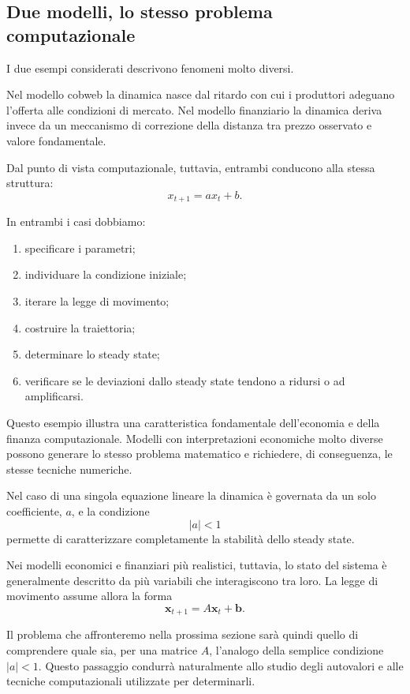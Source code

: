 \documentclass{book}
\begin{document}
\subsection{Due modelli, lo stesso problema computazionale}

I due esempi considerati descrivono fenomeni molto diversi.

Nel modello cobweb la dinamica nasce dal ritardo con cui i produttori
adeguano l'offerta alle condizioni di mercato. Nel modello finanziario
la dinamica deriva invece da un meccanismo di correzione della distanza
tra prezzo osservato e valore fondamentale.

Dal punto di vista computazionale, tuttavia, entrambi conducono alla
stessa struttura:
\[
x_{t+1}=ax_t+b.
\]

In entrambi i casi dobbiamo:

\begin{enumerate}
    \item specificare i parametri;
    \item individuare la condizione iniziale;
    \item iterare la legge di movimento;
    \item costruire la traiettoria;
    \item determinare lo steady state;
    \item verificare se le deviazioni dallo steady state tendono a
    ridursi o ad amplificarsi.
\end{enumerate}

Questo esempio illustra una caratteristica fondamentale
dell'economia e della finanza computazionale. Modelli con
interpretazioni economiche molto diverse possono generare lo stesso
problema matematico e richiedere, di conseguenza, le stesse tecniche
numeriche.

Nel caso di una singola equazione lineare la dinamica è governata da
un solo coefficiente, $a$, e la condizione
\[
|a|<1
\]
permette di caratterizzare completamente la stabilità dello steady
state.

Nei modelli economici e finanziari più realistici, tuttavia, lo stato
del sistema è generalmente descritto da più variabili che interagiscono
tra loro. La legge di movimento assume allora la forma
\[
\mathbf{x}_{t+1}=A\mathbf{x}_t+\mathbf{b}.
\]

Il problema che affronteremo nella prossima sezione sarà quindi quello
di comprendere quale sia, per una matrice $A$, l'analogo della semplice
condizione $|a|<1$. Questo passaggio condurrà naturalmente allo studio
degli autovalori e alle tecniche computazionali utilizzate per
determinarli.
\end{document}
